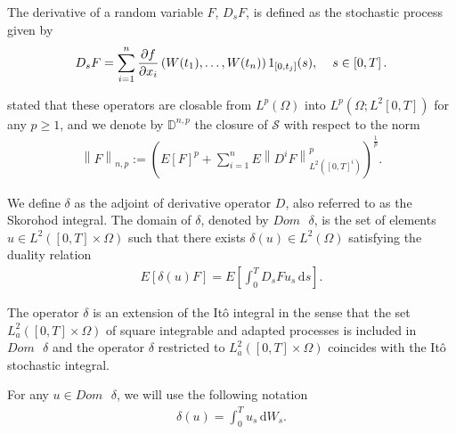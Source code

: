 \documentclass[a4paper,10pt]{article}
\renewcommand{\d}{\,\mathrm{d}}
\newcommand{\1}{\mathbf{1}}
\begin{document}
\medbreak

The derivative of a random variable $F$, $D_{s}F$, is defined as the stochastic process given by
\begin{eqnarray*}
D_{s}F = \sum^{n}_{i=1} \frac{\partial f}{\partial x_{i}}\left(W(t_{1}), \ldots, W(t_{n})\right)1_{\left[0, t_{j}\right]}(s), \hspace{0.4cm} s \in \left[0,T\right].
\end{eqnarray*}


\cite{Nualart} stated that these operators are closable from $L^{p}(\Omega)$ into $L^{p}(\Omega; L^{2}\left[0,T\right])$ for any $p\geq1$, and we denote by $\mathbb{D}^{n,p}$ the closure of $\mathcal{S}$ with respect to the norm
\begin{eqnarray*}
\left\|F\right\|_{n,p} := \left(E\left[F\right]^{p} + \sum^{n}_{i=1} E\left\|D^{i} F\right\|^{p}_{L^{2}\left(\left[0,T\right]^{i}\right)} \right)^{\frac{1}{p}}.
\end{eqnarray*}

\medbreak 

We define $\delta$ as the adjoint of derivative operator $D$, also referred to as the Skorohod integral. The domain of $\delta$, denoted by $Dom\text{ }\delta$, is the set of elements $u \in L^{2}([0,T] \times \Omega)$ such that there exists $\delta(u) \in L^{2}(\Omega)$ satisfying the duality relation
\begin{eqnarray*}
E\left[\delta(u) F \right] = E\left[\int^{T}_{0} D_{s} F u_{s} \d s\right].
\end{eqnarray*}

The operator $\delta$ is an extension of the Itô integral in the sense that the set $L^{2}_{a}([0,T] \times \Omega)$ of square integrable and adapted processes is included in $Dom\text{ }\delta$ and the operator $\delta$ restricted to $L^{2}_{a}([0,T] \times \Omega)$ coincides with the Itô stochastic integral.

\medbreak

For any $u \in Dom\text{ }\delta$, we will use the following notation
\begin{eqnarray*}
\delta(u)=\int^{T}_{0}u_{s}\d W_{s}.
\end{eqnarray*}
\end{document}

